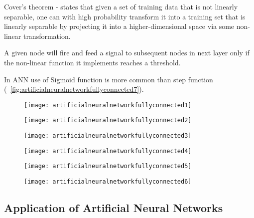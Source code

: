 \begin{numberedlist}
\begin{numberedlist}
			\item Cover's theorem - states that given a set of training data that is not linearly separable, one can with high probability transform it into a training set that is linearly separable by projecting it into a higher-dimensional space via some non-linear transformation.
		\end{numberedlist}
		\item A given node will fire and feed a signal to subsequent nodes in next layer only if the non-linear function it implements reaches a threshold.
		\item In ANN use of Sigmoid function is more common than step function (\figurename~\ref{fig:artificialneuralnetworkfullyconnected7}).
	\end{numberedlist}

 	\begin{figure}[h]
		\centering
		\texttt{[image: artificialneuralnetworkfullyconnected1]}
		\caption{}
		\label{fig:artificialneuralnetworkfullyconnected1}
	\end{figure}
 	\begin{figure}[h]
		\centering
		\texttt{[image: artificialneuralnetworkfullyconnected2]}
		\caption{}
		\label{fig:artificialneuralnetworkfullyconnected2}
	\end{figure}
 	\begin{figure}[h]
		\centering
		\texttt{[image: artificialneuralnetworkfullyconnected3]}
		\caption{}
		\label{fig:artificialneuralnetworkfullyconnected3}
	\end{figure}
 	\begin{figure}[h]
		\centering
		\texttt{[image: artificialneuralnetworkfullyconnected4]}
		\caption{}
		\label{fig:artificialneuralnetworkfullyconnected4}
	\end{figure}
 	\begin{figure}[h]
		\centering
		\texttt{[image: artificialneuralnetworkfullyconnected5]}
		\caption{}
		\label{fig:artificialneuralnetworkfullyconnected5}
	\end{figure}
 	\begin{figure}[h]
		\centering
		\texttt{[image: artificialneuralnetworkfullyconnected6]}
		\caption{}
		\label{fig:artificialneuralnetworkfullyconnected6}
	\end{figure}

	\subsection{Application of Artificial Neural Networks}


